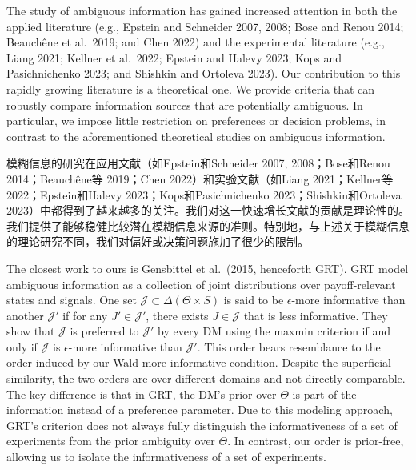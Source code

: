 \documentclass[12pt,a4paper]{article}
\newenvironment{original}
  {\par\vspace{4pt}\noindent\color{black}\ignorespaces}
  {\par\vspace{2pt}}
\newenvironment{translation}
  {\par\vspace{2pt}\noindent\color{myblue}\ignorespaces}
  {\par\vspace{6pt}}
\newcommand{\Delt}{\Delta}
\begin{document}
\begin{original}
The study of ambiguous information has gained increased attention in both the applied literature (e.g., Epstein and Schneider 2007, 2008; Bose and Renou 2014; Beauch\^{e}ne et al.\ 2019; and Chen 2022) and the experimental literature (e.g., Liang 2021; Kellner et al.\ 2022; Epstein and Halevy 2023; Kops and Pasichnichenko 2023; and Shishkin and Ortoleva 2023). Our contribution to this rapidly growing literature is a theoretical one. We provide criteria that can robustly compare information sources that are potentially ambiguous. In particular, we impose little restriction on preferences or decision problems, in contrast to the aforementioned theoretical studies on ambiguous information.
\end{original}

\begin{translation}
模糊信息的研究在应用文献（如Epstein和Schneider 2007, 2008；Bose和Renou 2014；Beauch\^{e}ne等 2019；Chen 2022）和实验文献（如Liang 2021；Kellner等 2022；Epstein和Halevy 2023；Kops和Pasichnichenko 2023；Shishkin和Ortoleva 2023）中都得到了越来越多的关注。我们对这一快速增长文献的贡献是理论性的。我们提供了能够稳健比较潜在模糊信息来源的准则。特别地，与上述关于模糊信息的理论研究不同，我们对偏好或决策问题施加了很少的限制。
\end{translation}

\begin{original}
The closest work to ours is Gensbittel et al.\ (2015, henceforth GRT). GRT model ambiguous information as a collection of joint distributions over payoff-relevant states and signals. One set $\mathcal{J}\subset\Delt(\Theta\times S)$ is said to be $\epsilon$-more informative than another $\mathcal{J}'$ if for any $J'\in\mathcal{J}'$, there exists $J\in\mathcal{J}$ that is less informative. They show that $\mathcal{J}$ is preferred to $\mathcal{J}'$ by every DM using the maxmin criterion if and only if $\mathcal{J}$ is $\epsilon$-more informative than $\mathcal{J}'$. This order bears resemblance to the order induced by our Wald-more-informative condition. Despite the superficial similarity, the two orders are over different domains and not directly comparable. The key difference is that in GRT, the DM's prior over $\Theta$ is part of the information instead of a preference parameter. Due to this modeling approach, GRT's criterion does not always fully distinguish the informativeness of a set of experiments from the prior ambiguity over $\Theta$. In contrast, our order is prior-free, allowing us to isolate the informativeness of a set of experiments.
\end{original}
\end{document}
